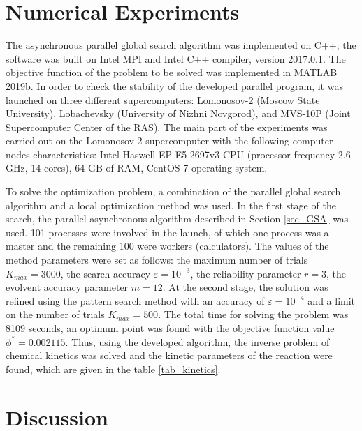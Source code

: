 \documentclass[mathematics,article,submit,pdftex,moreauthors]{Definitions/mdpi}
\begin{document}
\section{Numerical Experiments}\label{sec_numexper}

The asynchronous parallel global search algorithm was implemented on C++; the software was built on Intel MPI and Intel C++ compiler, version 2017.0.1. The objective function of the problem to be solved was implemented in MATLAB 2019b.
In order to check the stability of the developed parallel program, it was launched on three different supercomputers: Lomonosov-2 (Moscow State University), Lobachevsky (University of Nizhni Novgorod), and MVS-10P (Joint Supercomputer Center of the RAS). The main part of the experiments was carried out on the Lomonosov-2 supercomputer with the following computer nodes characteristics: Intel Haswell-EP E5-2697v3 CPU (processor frequency 2.6 GHz, 14 cores), 64 GB of RAM, CentOS 7 operating system.

To solve the optimization problem, a combination of the parallel global search algorithm and a local optimization method was used. In the first stage of the search, the parallel asynchronous algorithm described in Section \ref{sec_GSA} was used. 101 processes were involved in the launch, of which one process was a master and the remaining 100 were workers (calculators). The values of the method parameters were set as follows: the maximum number of trials $K_{max}=3000$, the search accuracy $\varepsilon=10^{-3}$, the reliability parameter $r=3$, the evolvent accuracy parameter $m=12$. At the second stage, the solution was refined using the pattern search method with an accuracy of $\varepsilon=10^{-4}$ and a limit on the number of trials $K_{max}=500$.
The total time for solving the problem was 8109 seconds, an optimum point was found with the objective function value $\phi^* = 0.002115$. Thus, using the developed algorithm, the inverse problem of chemical kinetics was solved and the kinetic parameters of the reaction were found, which are given in the table \ref{tab_kinetics}. 

\section{Discussion}\label{sec_discussion}

\end{document}
